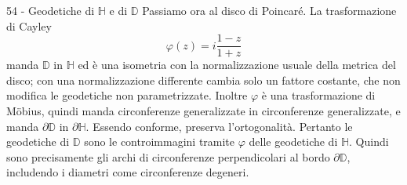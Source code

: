 \documentclass[a4paper]{article}
\begin{document}
\begin{snippetsolution}{54 - Geodetiche di \(\mathbb{H}\) e di \(\mathbb{D}\)}
    Passiamo ora al disco di Poincaré. La trasformazione di Cayley
    \[
        \varphi(z)=i\frac{1-z}{1+z}
    \]
    manda \(\mathbb{D}\) in \(\mathbb{H}\) ed è una isometria con la normalizzazione usuale della metrica del disco; con una normalizzazione differente cambia solo un fattore costante, che non modifica le geodetiche non parametrizzate. Inoltre \(\varphi\) è una trasformazione di Möbius, quindi manda circonferenze generalizzate in circonferenze generalizzate, e manda \(\partial\mathbb{D}\) in \(\partial\mathbb{H}\). Essendo conforme, preserva l'ortogonalità.
    Pertanto le geodetiche di \(\mathbb{D}\) sono le controimmagini tramite \(\varphi\) delle geodetiche di \(\mathbb{H}\). Quindi sono precisamente gli archi di circonferenze perpendicolari al bordo \(\partial\mathbb{D}\), includendo i diametri come circonferenze degeneri.
\end{snippetsolution}

%
%
%
\end{document}
